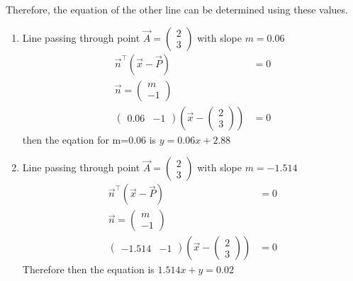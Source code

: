 \documentclass[12pt]{article}
\begin{document}
Therefore, the equation of the other line can be determined using these values.
\begin{enumerate}
\item Line passing through point $\vec{A} = \begin{pmatrix} 2 \\ 3 \end{pmatrix}$ with slope $m = 0.06$
\begin{align}
    \vec{n}^\top({\vec{x}-\vec{P}})&= 0 \\
    \vec{n} = \begin{pmatrix} m \\ -1 \end{pmatrix} \\
    \begin{pmatrix} 0.06 & -1 \end{pmatrix}(\vec{x}-\begin{pmatrix} 2 \\ 3 \end{pmatrix}) &= 0
\end{align}
then the eqation for m=0.06 is $y=0.06x+2.88$

\item Line passing through point $\vec{A} = \begin{pmatrix} 2 \\ 3 \end{pmatrix}$ with slope $m =-1.514$
\begin{align}
    \vec{n}^\top({\vec{x}-\vec{P}})&= 0 \\
    \vec{n} = \begin{pmatrix} m \\ -1 \end{pmatrix} \\
    \begin{pmatrix} -1.514 & -1 \end{pmatrix}(\vec{x}-\begin{pmatrix} 2 \\ 3 \end{pmatrix}) &= 0
\end{align}
Therefore then the equation is $1.514x+y=0.02$


\end{enumerate}
\end{document}
